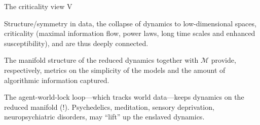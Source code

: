 \begin{frame}[label=ladila]{The criticality view V}

   Structure/symmetry in data, the collapse of dynamics to low-dimensional spaces, criticality (maximal information flow, power laws, long time scales and enhanced susceptibility),  \K and \SEP are thus deeply connected. \vfill 
   
The  manifold structure of the reduced dynamics together with  $\mathcal M$ provide, respectively, metrics on the simplicity of the  models and the amount of algorithmic information captured.  \vfill




The agent-world-lock loop---which tracks world   data---keeps dynamics on the reduced manifold (\SEP!). Psychedelics, meditation, sensory deprivation, neuropsychiatric disorders, may ``lift'' up the enslaved dynamics.
\end{frame}


